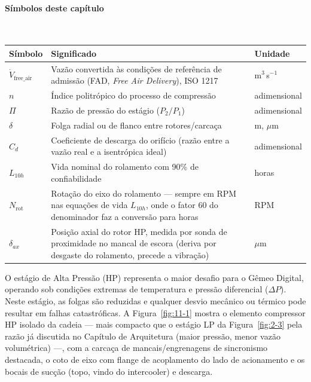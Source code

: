 \documentclass[12pt,a4paper]{article}
\numberwithin{equation}{section}
\numberwithin{table}{section}
\numberwithin{figure}{section}
\begin{document}
\paragraph{Símbolos deste capítulo}\mbox{}\\[-0.5em]
{\small
\begin{longtable}{>{\raggedright\arraybackslash}p{2.6cm} >{\raggedright\arraybackslash}p{9.2cm} >{\raggedright\arraybackslash}p{2.6cm}}
	\toprule
	\textbf{Símbolo} & \textbf{Significado} & \textbf{Unidade} \\ \midrule
	\endhead
	$\dot{V}_{\text{free\_air}}$ & Vazão convertida às condições de referência de admissão (FAD, \textit{Free Air Delivery}), ISO 1217 & m$^3$\,s$^{-1}$ \\
	$n$ & Índice politrópico do processo de compressão & adimensional \\
	$\Pi$ & Razão de pressão do estágio ($P_2/P_1$) & adimensional \\
	$\delta$ & Folga radial ou de flanco entre rotores/carcaça & m, $\mu$m \\
	$C_d$ & Coeficiente de descarga do orifício (razão entre a vazão real e a isentrópica ideal) & adimensional \\
	$L_{10h}$ & Vida nominal do rolamento com 90\% de confiabilidade & horas \\
	$N_{\text{rot}}$\dag & Rotação do eixo do rolamento — sempre em RPM nas equações de vida $L_{10h}$, onde o fator 60 do denominador faz a conversão para horas & RPM \\
	$\delta_{ax}$ & Posição axial do rotor HP, medida por sonda de proximidade no mancal de escora (deriva por desgaste do rolamento, precede a vibração) & $\mu$m \\
	\bottomrule
\end{longtable}
}




	
	O estágio de Alta Pressão (HP) representa o maior desafio para o Gêmeo Digital, operando sob condições extremas de temperatura e pressão diferencial ($\Delta P$). Neste estágio, as folgas são reduzidas e qualquer desvio mecânico ou térmico pode resultar em falhas catastróficas. A Figura~\ref{fig:11-1} mostra o elemento compressor HP isolado da cadeia — mais compacto que o estágio LP da Figura~\ref{fig:2-3} pela razão já discutida no Capítulo de Arquitetura (maior pressão, menor vazão volumétrica) —, com a carcaça de mancais/engrenagens de sincronismo destacada, o coto de eixo com flange de acoplamento do lado de acionamento e os bocais de sucção (topo, vindo do intercooler) e descarga.
\end{document}
